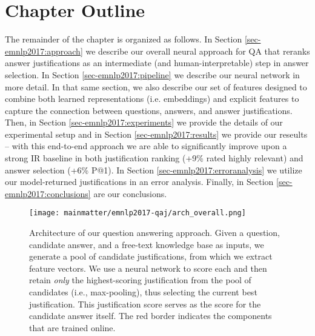 \section{Chapter Outline}
The remainder of the chapter is organized as follows.  In Section \ref{sec-emnlp2017:approach} we describe our overall neural approach for QA that reranks answer justifications as an intermediate (and human-interpretable) step in answer selection. In Section \ref{sec-emnlp2017:pipeline} we describe our neural network in more detail.  In that same section, we also describe our set of features designed to combine both learned representations (i.e. embeddings) and explicit features to capture the connection between questions, answers, and answer justifications.  Then, in Section \ref{sec-emnlp2017:experiments} we provide the details of our experimental setup and in Section \ref{sec-emnlp2017:results} we provide our reseults -- with this end-to-end approach we are able to significantly improve upon a strong IR baseline in both justification ranking (+9\% rated highly relevant) and answer selection (+6\% P@1).  In Section \ref{sec-emnlp2017:erroranalysis} we utilize our model-returned justifications in an error analysis.  Finally, in Section \ref{sec-emnlp2017:conclusions} are our conclusions.




\begin{figure}[t]
\begin{center}
\texttt{[image: mainmatter/emnlp2017-qaj/arch\_overall.png]}
\caption{ Architecture of our question answering approach.  
Given a question, candidate answer, and a free-text knowledge base as inputs, we generate a pool of candidate justifications, from which we extract feature vectors.  We use a neural network to score each and then retain \textit{only} the highest-scoring justification from the pool of candidates (i.e., max-pooling), thus selecting the current best justification. This justification score serves as the score for the candidate answer itself.  The red border indicates the components that are trained online. }
\label{fig:arch_overall}
\end{center}
\end{figure}

